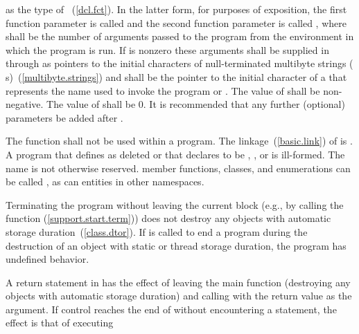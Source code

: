 %
%
as the type of ~(\ref{dcl.fct}).
%
%
In the latter form, for purposes of exposition, the first function
parameter is called  and the second function parameter is
called , where  shall be the number of
arguments passed to the program from the environment in which the
program is run. If
 is nonzero these arguments shall be supplied in
 through  as pointers to the initial
characters of null-terminated multibyte strings (\ntmbs
s)~(\ref{multibyte.strings}) and  shall be the pointer to
the initial character of a \ntmbs that represents the name used to
invoke the program or . The value of  shall be
non-negative. The value of  shall be 0. \enternote It
is recommended that any further (optional) parameters be added after
. \exitnote

\pnum
The function  shall not be used within
a program.
%
The linkage~(\ref{basic.link}) of  is
. A program that defines  as
deleted or that declares  to be
, , or  is ill-formed. The name  is
not otherwise reserved. \enterexample member functions, classes, and
enumerations can be called , as can entities in other
namespaces. \exitexample

\pnum
{}%
%
%
Terminating the program
without leaving the current block (e.g., by calling the function
 (\ref{support.start.term})) does not destroy any
objects with automatic storage duration~(\ref{class.dtor}). If
 is called to end a program during the destruction of
an object with static or thread storage duration, the program has undefined
behavior.

\pnum
{}%
%
A return statement in  has the effect of leaving the main
function (destroying any objects with automatic storage duration) and
calling  with the return value as the argument. If
control reaches the end of  without encountering a
 statement, the effect is that of executing

